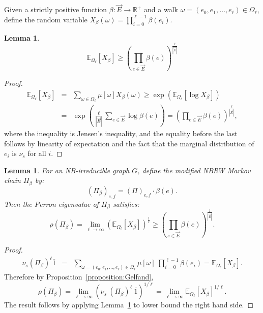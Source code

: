 \documentclass{article}
\newtheorem{lemma}[theorem]{Lemma}
\newcommand{\dirE}{\vec{E}}
\newcommand{\R}{\mathbb{R}}  %
\newcommand{\E}{\mathbb{E}} %
\begin{document}
Given a strictly positive function $\beta:\dirE\rightarrow\R^+$ 
and a walk $\omega = (e_0,e_1,\ldots,e_\ell)\in \Omega_\ell$, 
define the random variable 
$X_\beta(\omega) = \prod_{i=0}^{\ell-1} \beta(e_i)$.

\begin{lemma}\label{lemma:Xbeta_lb}
    \begin{equation*}
        \E_{\Omega_\ell}[X_\beta] \geq \left( \prod_{e \in \dirE} \beta(e) \right)^{\frac{\ell}{|\dirE|}}
    \end{equation*}
\end{lemma}

\begin{proof}
    \begin{eqnarray*}
        \E_{\Omega_\ell}[X_\beta] 
        &=& \sum_{\omega \in \Omega_\ell} \mu[\omega] X_\beta(\omega) 
        \geq \exp\left( \E_{\Omega_\ell}[\log X_\beta]\right)\\
        &=& \exp\left( \frac{\ell}{|\dirE|} \sum_{e \in \dirE} \log \beta(e)\right)
        = \left( \prod_{e \in \dirE} \beta(e) \right)^\frac{\ell}{|\dirE|},        
    \end{eqnarray*}
    where the inequality is Jensen's inequality, and the equality before the last follows by linearity of expectation and the fact that the marginal distribution of $e_i$ is $\nu_s$ for all $i$.
\end{proof}

\begin{lemma}\label{lemma:ModifiedPiPerronLowerBound}
    For an NB-irreducible graph $G$, define the modified NBRW Markov chain $\Pi_\beta$ by:
    \begin{equation*}
        (\Pi_\beta)_{e,f} = (\Pi)_{e,f} \cdot \beta(e).
    \end{equation*}
    Then the Perron eigenvalue of $\Pi_\beta$ satisfies:
    \begin{equation}
        \rho(\Pi_\beta) 
        =    \lim_{\ell \rightarrow \infty} \left( \E_{\Omega_\ell}[X_\beta] \right)^\frac{1}{\ell} 
        \geq \left( \prod_{e \in \dirE} \beta(e) \right)^\frac{1}{|\dirE|}.
    \end{equation}
\end{lemma}

\begin{proof}
    \begin{eqnarray*}
         \nu_s \left( \Pi_\beta \right)^{\ell} \overline{1} 
         &=& \sum_{\omega = (e_0,e_1,\ldots,e_\ell) \in \Omega_\ell} \mu[\omega] \ \prod_{i=0}^{\ell-1} \beta(e_i) 
         = \E_{\Omega_\ell}[X_\beta].
    \end{eqnarray*}
    Therefore by Proposition~\ref{proposition:Gelfand},
    \begin{equation*}
         \rho(\Pi_\beta) 
         = \lim_{\ell \rightarrow \infty} \left( \nu_s \ ( \Pi_\beta )^\ell \ \overline{1} \right)^{1/\ell}
         =   \lim_{\ell \rightarrow \infty} \E_{\Omega_\ell}[X_\beta]^{1/\ell}.
    \end{equation*}
    The result follows by applying Lemma~\ref{lemma:Xbeta_lb} to lower bound the right hand side.
\end{proof}
\end{document}
